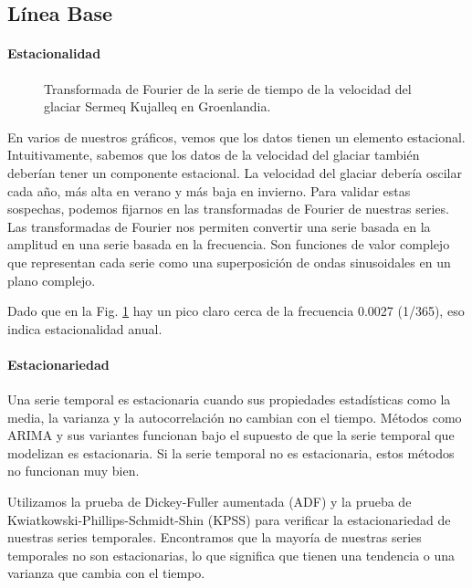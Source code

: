 \documentclass[sigconf,authordraft,language=spanish]{acmart}
\begin{document}
\subsection{Línea Base}

\paragraph{Estacionalidad}

\begin{figure}[htbp]
   \centering
   
    \caption{Transformada de Fourier de la serie de tiempo de la velocidad del glaciar Sermeq Kujalleq en Groenlandia.}
    \label{fig:frequencies}
\end{figure}

En varios de nuestros gráficos, vemos que los datos tienen un elemento estacional. Intuitivamente, sabemos que los datos de la velocidad del glaciar también deberían tener un componente estacional. La velocidad del glaciar debería oscilar cada año, más alta en verano y más baja en invierno. 
Para validar estas sospechas, podemos fijarnos en las transformadas de Fourier de nuestras series.
Las transformadas de Fourier nos permiten convertir una serie basada en la amplitud en una serie basada en la frecuencia. Son funciones de valor complejo que representan cada serie como una superposición de ondas sinusoidales en un plano complejo.

Dado que en la Fig. \ref{fig:frequencies} hay un pico claro cerca de la frecuencia 0.0027 (1/365), eso indica estacionalidad anual.


\paragraph{Estacionariedad}

Una serie temporal es estacionaria cuando sus propiedades estadísticas como la media, la varianza y la autocorrelación no cambian con el tiempo.
Métodos como ARIMA y sus variantes funcionan bajo el supuesto de que la serie temporal que modelizan es estacionaria. Si la serie temporal no es estacionaria, estos métodos no funcionan muy bien.

Utilizamos la prueba de Dickey-Fuller aumentada (ADF) y la prueba de Kwiatkowski-Phillips-Schmidt-Shin (KPSS) para verificar la estacionariedad de nuestras series temporales.
Encontramos que la mayoría de nuestras series temporales no son estacionarias, lo que significa que tienen una tendencia o una varianza que cambia con el tiempo.
\end{document}
